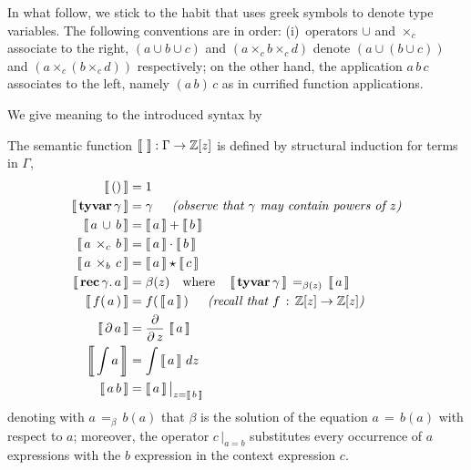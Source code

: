 In what follow, we stick to the habit that uses greek symbols to denote type
variables. The following conventions are in order: (i)~operators $\cup$ and
$\times_{c}$ associate to the right, $(a \cup b \cup c)$ and $(a \times_{c} b
\times_{c} d)$ denote $\left(a \cup (b \cup c)\right)$ and $(a \times_{c} (b
\times_{c} d))$ respectively; on the other hand, the application $a\,b\,c$
associates to the left, namely $(a\,b)\,c$ as in currified function
applications.

We give meaning to the introduced syntax by 
\begin{definition}[Semantic]
The semantic function $\left\llbracket\,\,\right\rrbracket: \Gamma \rightarrow
\mathbb{Z}[z]$ is defined by structural induction for terms in $\Gamma$,
\begin{displaymath}
\begin{split}
    \semantic{()} &= 1 \\
    \semantic{\textbf{tyvar}\,\gamma} &= \gamma\indent\textit{(observe that $\gamma$ may contain powers of $z$)} \\
    \semantic{\tydu{a}{b}} &= \semantic{a} + \semantic{b} \\
    \semantic{a\,\times_{c}\,b} &= \semantic{a}\cdot\semantic{b} \\
    \semantic{a\,\times_{b}\,c} &= \semantic{a}\star\semantic{c} \\
    \semantic{\textbf{rec}\,\gamma.\,a} &= \beta(z)  \quad\text{where}\quad
        \semantic{\textbf{tyvar}\,\gamma}\,=_{\beta(z)}\,\semantic{a}\\
    \semantic{f(\,a\,)} &= f(\,\semantic{a}\,)\indent\textit{(recall that $f\,:\,\mathbb{Z}[z]\rightarrow\mathbb{Z}[z]$)}\\
    \semantic{\partial\,a} &= \frac{\partial}{\partial\,z}\,\semantic{a}\\
    \semantic{\int{a}} &= \int{\semantic{a}\,dz}\\
    \semantic{a\,b} &= \semantic{a}\big|_{z=\semantic{b}}\\
\end{split}
\end{displaymath}
denoting with $a\,=_{\beta}\,b(a)$ that $\beta$ is the solution of the equation
$a\,=\,b(a)$ with respect to $a$; moreover, the operator $c\,\big|_{a=b}$
substitutes every occurrence of $a$ expressions with the $b$ expression in the
context expression $c$.
\end{definition}

